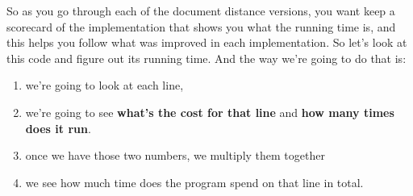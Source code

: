 \documentclass{article}
\begin{document}
    So as you go through each of the document distance versions, you want keep a scorecard of the implementation that shows you what the running time is, and this helps you follow what was improved in each implementation.
    So let's look at this code and figure out its running time. 
    And the way we're going to do that is:
    \begin{enumerate}
        \item we're going to look at each line, 
        \item we're going to see \textbf{what's the cost for that line} and \textbf{how many times does it run}. 
        \item once we have those two numbers, we multiply them together 
        \item we see how much time does the program spend on that line in total.
    \end{enumerate}
    \newpage
\end{document}
